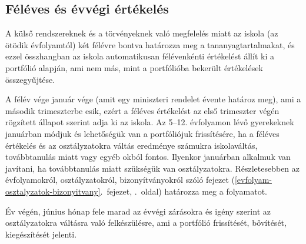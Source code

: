 \hypertarget{feleves-es-evvegi-ertekeles}{%
\subsection{Féléves és évvégi
értékelés}\label{feleves-es-evvegi-ertekeles}}

A külső rendszereknek és a törvényeknek való megfelelés miatt az iskola
(az ötödik évfolyamtól) két félévre bontva határozza meg a
tananyagtartalmakat, és ezzel összhangban az iskola automatikusan félévenkénti értékelést
állít ki a portfólió alapján, ami nem más, mint a
portfólióba bekerült értékelések összegyűjtése.

A félév vége január vége (amit egy miniszteri rendelet évente határoz
meg), ami a második trimeszterbe esik, ezért a féléves értékelést az
első trimeszter végén rögzített állapot szerint adja ki az iskola. Az
5--12. évfolyamon lévő gyerekeknek januárban módjuk és lehetőségük van a
portfóliójuk frissítésére, ha a féléves értékelés és az osztályzatokra
váltás eredménye számukra iskolaváltás, továbbtanulás miatt vagy egyéb okból
fontos. Ilyenkor januárban alkalmuk van javítani, ha 
továbbtanulás miatt szükségük van osztályzatokra. Részletesebben az
évfolyamokról, osztályzatokról, bizonyítványokról szóló fejezet (\ref{evfolyam-osztalyzatok-bizonyitvany}.~fejezet, \pageref{evfolyam-osztalyzatok-bizonyitvany}.~oldal)
határozza meg a folyamatot.

Év végén, június hónap fele marad az évvégi zárásokra és igény szerint az
osztályzatokra váltásra való felkészülésre, ami a portfólió frissítését,
bővítését, kiegészítését jelenti.
